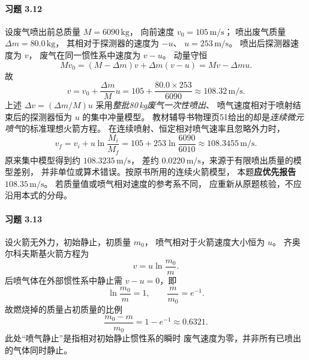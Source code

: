 \paragraph{习题 3.12}
设废气喷出前总质量 \(M=6090\,\mathrm{kg}\)，
向前速度 \(v_0=105\,\mathrm{m/s}\)；
喷出废气质量 \(\Delta m=80.0\,\mathrm{kg}\)，
其相对于探测器的速度为 \(-u\)、
\(u=253\,\mathrm{m/s}\)。
喷出后探测器速度为 \(v\)，
废气在同一惯性系中速度为 \(v-u\)。
动量守恒
\[
 Mv_0=(M-\Delta m)v+\Delta m(v-u)
 =Mv-\Delta m u.
\]
故
\[
 \boxed{v=v_0+\frac{\Delta m}{M}u
 =105+\frac{80.0\times253}{6090}
 \approx108.32\,\mathrm{m/s}}.
\]
上述 \(\Delta v=(\Delta m/M)u\) 采用\emph{整批80\,kg废气一次性喷出}、
喷气速度相对于喷射结束后的探测器恒为 \(u\) 的集中冲量模型。
教材辅导书物理页51给出的却是\emph{连续微元喷气}的标准理想火箭方程。
在连续喷射、恒定相对喷气速率且忽略外力时，
\[
\boxed{v_f=v_i+u\ln\frac{M_i}{M_f}
=105+253\ln\frac{6090}{6010}
\approx108.3455\,\mathrm{m/s}}.
\]
原来集中模型得到约 \(108.3235\,\mathrm{m/s}\)，
差约 \(0.0220\,\mathrm{m/s}\)，来源于有限喷出质量的模型差别，
并非单位或算术错误。按原书所用的连续火箭模型，
本题\textbf{应优先报告 \(108.35\,\mathrm{m/s}\)}。
若质量值或喷气相对速度的参考系不同，
应重新从原题核验，不应沿用本式的分母。

\paragraph{习题 3.13}
设火箭无外力，初始静止，初质量 \(m_0\)，
喷气相对于火箭速度大小恒为 \(u\)。
齐奥尔科夫斯基火箭方程为
\[
 v=u\ln\frac{m_0}{m}.
\]
后喷气体在外部惯性系中静止需
\(v-u=0\)，即
\[
 \ln\frac{m_0}{m}=1,\qquad
 \frac{m}{m_0}=e^{-1}.
\]
故燃烧掉的质量占初质量的比例
\[
 \boxed{\frac{m_0-m}{m_0}=1-e^{-1}
 \approx0.6321}.
\]
此处“喷气静止”是指相对初始静止惯性系的瞬时
废气速度为零，并非所有已喷出的气体同时静止。

